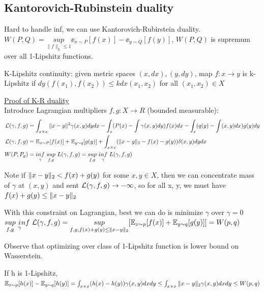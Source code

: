 \documentclass[12pt,a4paper]{article}
\begin{document}
\subsection{Kantorovich-Rubinstein duality}
Hard to handle inf, we can use Kantorovich-Rubirstein duality.
$W(P,Q)=\underset{\|f\|_L\le 1}{sup} \ee_{x\sim P}[f(x)]-\ee_{y\sim Q}[f(y)]$, $W(P,Q)$ is supremum over all 1-Lipshitz functions. 

K-Lipshitz continuity: given metric spaces $(x,dx), (y,dy)$, map $f: x\rightarrow y$ is k-Lipshitz if $dy(f(x_1), f(x_2))\le k dx(x_1, x_2)$ for all $(x_1, x_2)\in X$


\vspace{0.5cm}
\underline{Proof of K-R duality}\\
Introduce Lagrangian multipliers $f,g: X \rightarrow R$ (bounded measurable):\\ 
\begin{equation}
    \begin{split}
\lossl(\gamma, f,g)& =\int_{x\times x} \|x-y\|^2 \gamma(x,y)dydx-\int_x(P(x)-\int \gamma(x,y)dy)f(x)dx-\int_x(q(y)-\int(x,y)dx)g(y)dy\\
\lossl(\gamma, f, g) &= \ee_{x\sim P}[f(x)]+\ee_{y\sim q}[g(y)] +\int_{x\times x} (\norm{x-y}-f(x)-g(y)) \delta(x,y) dydx \\
W(P, P_g) &=\underset{\gamma}{inf}\ \underset{f,g}{sup}\ L(\gamma,f,g) = \underset{f,g}{sup}\ \underset{\gamma}{inf}\ L(\gamma, f,g)
    \end{split}
\end{equation}

Note if $\|x-y\|_2<f(x)+g(y)$ for some $x,y\in X$, then we can concentrate mass of $\gamma$ at $(x,y)$ and sent $\mathcal{L} (\gamma, f,g)\rightarrow -\infty$, so for all x, y, we must have $f(x)+g(y)\le \|x-y\|_2$

With this constraint on Lagrangian, best we can do is minimize $\gamma$ over $\gamma=0$\\
$\underset{f,g}{sup}\ \underset{\gamma}inf\ \lossl(\gamma, f,g)=\underset{f,g,f(x)+g(y)\le \norm{x-y}}{sup} [\ee_{x\sim p}[f(x)]+\ee_{y\sim q}[g(y)]]=W(p,q)$

\vspace{0.5cm}
Observe that optimizing over class of 1-Lipshitz function is lower bound on Wasserstein. 

If h is 1-Lipshitz,
$\mathbb{E}_{x\sim p}[h(x)]-\mathbb{E}_{y\sim q}[h(y)]=\int_{x\times x}(h(x)-h(y))\gamma(x,y)dxdy\\
\le \int_{x\times x}\|x-y\|_2\gamma(x,y)dxdy
\le W(p,q)$
\end{document}
